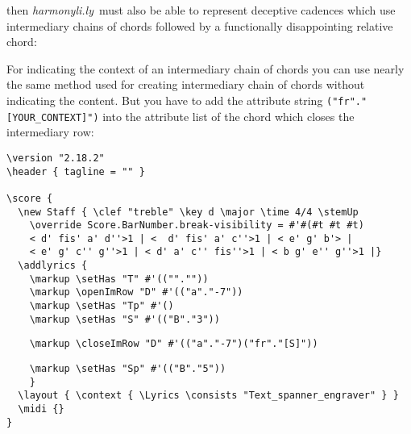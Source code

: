 \documentclass[
  DIV=calc,
  BCOR=5mm,
  12pt,
  headings=small,
  oneside,
  abstract=true,
  toc=bib,
  xcolor=dvipsnames,
  openany,
  ngerman,english]{scrartcl}
\newcommand{\hlyn}[0]{\textit{harmonyli.ly}}
\begin{document}
then \hlyn\  must also be able to represent deceptive cadences which use
intermediary chains of chords followed by a functionally disappointing relative
chord:

\begin{center}
\end{center}

For indicating the context of an intermediary chain of chords you can use nearly
the same method used for creating intermediary chain of chords without
indicating the content. But you have to add the attribute string
\texttt{("fr"."[YOUR\_CONTEXT]")} into the attribute list of the chord which
closes the intermediary row:

\begin{scriptsize}
\begin{verbatim}
\version "2.18.2"
\header { tagline = "" }

\score {
  \new Staff { \clef "treble" \key d \major \time 4/4 \stemUp 
    \override Score.BarNumber.break-visibility = #'#(#t #t #t)
    < d' fis' a' d''>1 | <  d' fis' a' c''>1 | < e' g' b'> |
    < e' g' c'' g''>1 | < d' a' c'' fis''>1 | < b g' e'' g''>1 |}
  \addlyrics { 
    \markup \setHas "T" #'((""."")) 
    \markup \openImRow "D" #'(("a"."-7")) 
    \markup \setHas "Tp" #'() 
    \markup \setHas "S" #'(("B"."3"))     
\end{verbatim}
{ \color{red} \verb|    \markup \closeImRow "D" #'(("a"."-7")("fr"."[S]"))| }
\begin{verbatim} 
    \markup \setHas "Sp" #'(("B"."5"))
    }
  \layout { \context { \Lyrics \consists "Text_spanner_engraver" } }
  \midi {}
}
\end{verbatim}
\end{scriptsize}
\end{document}
